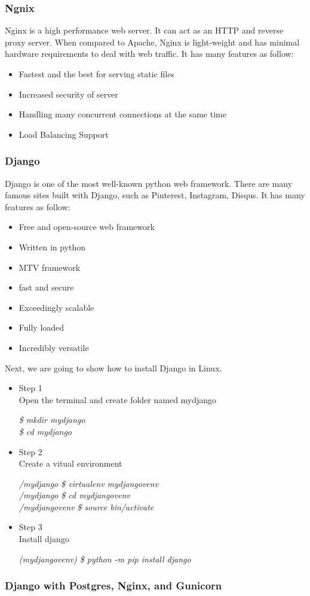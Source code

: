 \subsubsection{Ngnix}
Nginx is a high performance web server. It can act as an HTTP and reverse proxy server. When compared to Apache, Nginx is light-weight and has minimal hardware requirements to deal with web traffic. It has many features as follow:
\begin{itemize}
	\item Fastest and the best for serving static files
	\item Increased security of server 
	\item Handling many concurrent connections at the same time
	\item Load Balancing Support
\end{itemize}
\subsubsection{Django}
Django is one of the most well-known python web framework. There are many famous sites built with Django, such as Pinterest, Instagram, Disqus. It has many features as follow:
\begin{itemize}
	\item Free and open-source web framework
	\item Written in python
	\item MTV framework
	\item fast and secure
	\item Exceedingly scalable
	\item Fully loaded
	\item Incredibly versatile
\end{itemize}
Next, we are going to show how to install Django in Linux.
\begin{itemize}
	  
		\item Step 1\\
		Open the terminal and create folder named mydjango
		\begin{enumerate}
			\emph {\$ mkdir mydjango}\\
			\emph {\$ cd mydjango}
		\end{enumerate}	
		\item Step 2\\
		Create a vitual environment
		\begin{enumerate}
			\emph {/mydjango \$ virtualenv mydjangovenv}\\
			\emph {/mydjango \$ cd mydjangovenv}\\
			\emph {/mydjangovenv \$ source bin/activate}
		\end{enumerate}	
		\item Step 3\\
		Install django
		\begin{enumerate}
			\emph {(mydjangovenv) \$ python -m pip install django}\\
		\end{enumerate}	
\end{itemize}
\subsubsection{Django with Postgres, Nginx, and Gunicorn}
